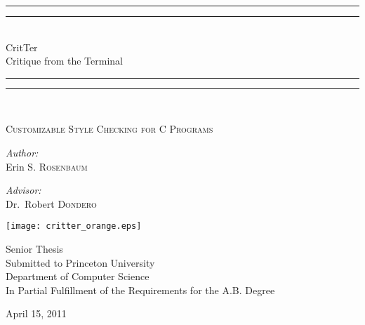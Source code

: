 \begin{titlepage}

\begin{center}

\rule{\linewidth}{1.6pt}\vspace*{-\baselineskip}\vspace*{2pt}
\rule{\linewidth}{0.4pt}\\[\baselineskip]
{\huge CritTer \\[0.5\baselineskip] Critique from the Terminal}\\[0.2\baselineskip]
\rule{\linewidth}{0.4pt}\vspace*{-\baselineskip}\vspace{3.2pt}
\rule{\linewidth}{1.6pt}\\[\baselineskip]
{\scshape
\Large Customizable Style Checking for C Programs \par}
\vspace*{4\baselineskip}

\begin{minipage}{0.4\textwidth}
\begin{flushleft} \large
\emph{Author:}\\
Erin S. \textsc{Rosenbaum}
\end{flushleft}
\end{minipage}
\begin{minipage}{0.4\textwidth}
\begin{flushright} \large
\emph{Advisor:} \\
Dr.~Robert \textsc{Dondero}
\end{flushright}
\end{minipage}

\vspace{1.5cm}
\texttt{[image: critter\_orange.eps]}

\vspace{1.5cm}
\small{
Senior Thesis \\[0.4cm]
Submitted to Princeton University \\
Department of Computer Science\\
In Partial Fulfillment of the Requirements for the A.B. Degree \\
}

\vfill

{\normalsize April 15, 2011}

\end{center}

\end{titlepage}
